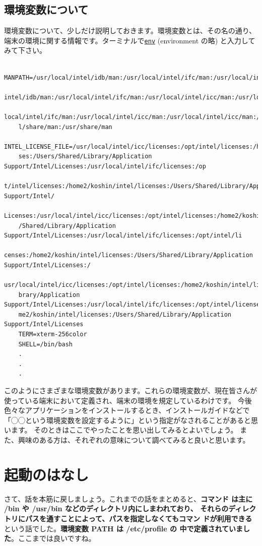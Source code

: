 \documentclass[a4j]{ltjreport}
\begin{document}
    \subsection{環境変数について}
    環境変数について、少しだけ説明しておきます。環境変数とは、その名の通り、
    端末の環境に関する情報です。ターミナルで\underline{\texttt{env}} (environment の略) 
    と入力してみて下さい。
    \begin{verbatim}
    MANPATH=/usr/local/intel/idb/man:/usr/local/intel/ifc/man:/usr/local/intel/icc/man:/usr/local/
    intel/idb/man:/usr/local/intel/ifc/man:/usr/local/intel/icc/man:/usr/local/intel/idb/man:/usr/
    local/intel/ifc/man:/usr/local/intel/icc/man:/usr/local/intel/icc/man:/usr/local/man:/usr/loca
    l/share/man:/usr/share/man
    INTEL_LICENSE_FILE=/usr/local/intel/icc/licenses:/opt/intel/licenses:/home2/koshin/intel/licen
    ses:/Users/Shared/Library/Application Support/Intel/Licenses:/usr/local/intel/ifc/licenses:/op
    t/intel/licenses:/home2/koshin/intel/licenses:/Users/Shared/Library/Application Support/Intel/
    Licenses:/usr/local/intel/icc/licenses:/opt/intel/licenses:/home2/koshin/intel/licenses:/Users
    /Shared/Library/Application Support/Intel/Licenses:/usr/local/intel/ifc/licenses:/opt/intel/li
    censes:/home2/koshin/intel/licenses:/Users/Shared/Library/Application Support/Intel/Licenses:/
    usr/local/intel/icc/licenses:/opt/intel/licenses:/home2/koshin/intel/licenses:/Users/Shared/Li
    brary/Application Support/Intel/Licenses:/usr/local/intel/ifc/licenses:/opt/intel/licenses:/ho
    me2/koshin/intel/licenses:/Users/Shared/Library/Application Support/Intel/Licenses
    TERM=xterm-256color
    SHELL=/bin/bash
    .                                                
    .
    .
    \end{verbatim}

    このようにさまざまな環境変数があります。これらの環境変数が、現在皆さんが
    使っている端末において定義され、端末の環境を規定しているわけです。
    今後色々なアプリケーションをインストールするとき、インストールガイドなどで
    「◯◯という環境変数を設定するように」という指定がなされることがあると思います。
    そのときはここでやったことを思い出してみるとよいでしょう。
    また、興味のある方は、それぞれの意味について調べてみると良いと思います。



    \section{起動のはなし}
    さて、話を本筋に戻しましょう。これまでの話をまとめると、\textbf{コマンド
    は主に /bin や /usr/bin などのディレクトリ内にしまわれており、
    それらのディレクトリにパスを通すことによって、パスを指定しなくてもコマン
    ドが利用できる}という話でした。\textbf{環境変数 PATH は /etc/profile の
    中で定義されていました}。ここまでは良いですね。
\end{document}
